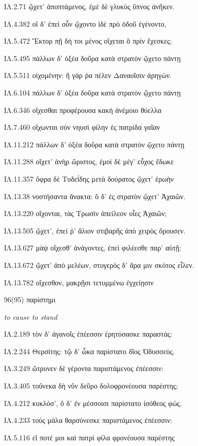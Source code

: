 \begin{enumerate}
{ΙΛ.2.71 ᾤχετ' ἀποπτάμενος, ἐμὲ δὲ γλυκὺς ὕπνος ἀνῆκεν. 

ΙΛ.4.382 οἳ δ' ἐπεὶ οὖν ᾤχοντο ἰδὲ πρὸ ὁδοῦ ἐγένοντο, 

ΙΛ.5.472 Ἕκτορ πῇ δή τοι μένος οἴχεται ὃ πρὶν ἔχεσκες; 

ΙΛ.5.495 πάλλων δ' ὀξέα δοῦρα κατὰ στρατὸν ᾤχετο πάντῃ 

ΙΛ.5.511 οἰχομένην: ἣ γάρ ῥα πέλεν Δαναοῖσιν ἀρηγών. 

ΙΛ.6.104 πάλλων δ' ὀξέα δοῦρα κατὰ στρατὸν ᾤχετο πάντῃ 

ΙΛ.6.346 οἴχεσθαι προφέρουσα κακὴ ἀνέμοιο θύελλα 

ΙΛ.7.460 οἴχωνται σὺν νηυσὶ φίλην ἐς πατρίδα γαῖαν 

ΙΛ.11.212 πάλλων δ' ὀξέα δοῦρα κατὰ στρατὸν ᾤχετο πάντῃ 

ΙΛ.11.288 οἴχετ' ἀνὴρ ὤριστος, ἐμοὶ δὲ μέγ' εὖχος ἔδωκε 

ΙΛ.11.357 ὄφρα δὲ Τυδεΐδης μετὰ δούρατος ᾤχετ' ἐρωὴν 

ΙΛ.13.38 νοστήσαντα ἄνακτα: ὃ δ' ἐς στρατὸν ᾤχετ' Ἀχαιῶν. 

ΙΛ.13.220 οἴχονται, τὰς Τρωσὶν ἀπείλεον υἷες Ἀχαιῶν; 

ΙΛ.13.505 ᾤχετ', ἐπεί ῥ' ἅλιον στιβαρῆς ἀπὸ χειρὸς ὄρουσεν. 

ΙΛ.13.627 μὰψ οἴχεσθ' ἀνάγοντες, ἐπεὶ φιλέεσθε παρ' αὐτῇ: 

ΙΛ.13.672 ᾤχετ' ἀπὸ μελέων, στυγερὸς δ' ἄρα μιν σκότος εἷλεν. 

ΙΛ.13.782 οἴχεσθον, μακρῇσι τετυμμένω ἐγχείῃσιν 

}

\clearpage
\item[\large 96(95)]{\large \g παρίστημι}

\hspace{0.2cm} \textit{ to cause to stand }

{\g
ΙΛ.2.189 τὸν δ' ἀγανοῖς ἐπέεσσιν ἐρητύσασκε παραστάς: 

ΙΛ.2.244 Θερσίτης: τῷ δ' ὦκα παρίστατο δῖος Ὀδυσσεύς, 

ΙΛ.3.249 ὤτρυνεν δὲ γέροντα παριστάμενος ἐπέεσσιν: 

ΙΛ.3.405 τοὔνεκα δὴ νῦν δεῦρο δολοφρονέουσα παρέστης; 

ΙΛ.4.212 κυκλόσ', ὃ δ' ἐν μέσσοισι παρίστατο ἰσόθεος φώς, 

ΙΛ.4.233 τοὺς μάλα θαρσύνεσκε παριστάμενος ἐπέεσσιν: 

ΙΛ.5.116 εἴ ποτέ μοι καὶ πατρὶ φίλα φρονέουσα παρέστης 

}
\end{enumerate}
